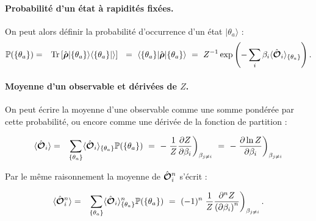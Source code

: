 \paragraph{Probabilité d’un état à rapidités fixées.}
On peut alors définir la probabilité d’occurrence d’un état $\vert { \theta_a } \rangle$ :
\begin{eqnarray}
	\mathbb{P} ( \{ \theta_a \} ) & = & \mathrm{Tr} \left [\operator{\rho} \vert \{ \theta_a \} \rangle \langle \{ \theta_a \} \vert \rangle \right ] ~=~  \langle \{ \theta_a \} \vert	\operator{\rho} \vert \{ \theta_a \} \rangle ~=~ Z^{-1} \exp \left (- \sum_i \beta_i \langle\operator{\mathcal{O}}_i\rangle_{\{\theta_a\}} \right ) .
\end{eqnarray}

\paragraph{Moyenne d’un observable et dérivées de $Z$.}
On peut écrire la moyenne d’une observable comme une somme pondérée par cette probabilité, ou encore comme une dérivée de la fonction de partition :

\begin{eqnarray}
	\langle \hat{\bm{\mathcal{O}}}_i \rangle &= & \sum_{\{ \theta_a\}} \langle\hat{\bm{\mathcal{O}}}_i\rangle_{\{\theta_a\}} \mathbb{P} ( \{ \theta_a \} ) ~=~- \left. \frac{1}{Z} \frac{\partial Z}{\partial \beta_i} \right )_{\beta_{j \neq i }} ~=~ - 	\left . \frac{\partial  \ln Z}{\partial \beta_i} \right )_{\beta_{j \neq i }}	
\end{eqnarray}

Par le même raisonnement la moyenne de $\hat{\bm{\mathcal{O}}}_i^n$ s'écrit :

\begin{eqnarray}
	\langle \hat{\bm{\mathcal{O}}}_i^n \rangle &= & \sum_{\{ \theta_a\}} \langle\hat{\bm{\mathcal{O}}}_i\rangle_{\{\theta_a\}}^n \mathbb{P} ( \{ \theta_a \} ) ~=~ (-1)^n \left. \frac{1}{Z} \frac{\partial^n Z}{{(\partial \beta_i)}^n} \right )_{\beta_{j \neq i }} .	
\end{eqnarray}

